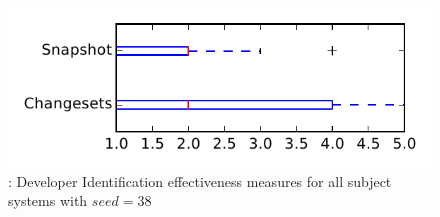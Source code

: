 
\begin{figure}
\centering
\includegraphics[height=0.4\textheight]{figures/dit_seed/rq1_tiny_38}
\caption{\rtwo: Developer Identification effectiveness measures for all subject systems with $seed=38$}
\label{fig:dit_seed:rq1:tiny}
\end{figure}
